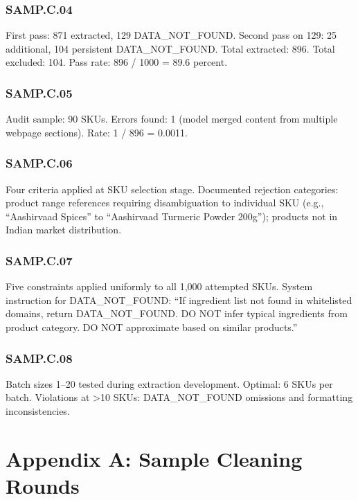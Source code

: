 \documentclass[
  letterpaper,
  DIV=11,
  numbers=noendperiod]{scrartcl}
\begin{document}
\subsubsection{SAMP.C.04}\label{samp.c.04}

First pass: 871 extracted, 129 DATA\_NOT\_FOUND. Second pass on 129: 25
additional, 104 persistent DATA\_NOT\_FOUND. Total extracted: 896. Total
excluded: 104. Pass rate: 896 / 1000 = 89.6 percent.

\subsubsection{SAMP.C.05}\label{samp.c.05}

Audit sample: 90 SKUs. Errors found: 1 (model merged content from
multiple webpage sections). Rate: 1 / 896 = 0.0011.

\subsubsection{SAMP.C.06}\label{samp.c.06}

Four criteria applied at SKU selection stage. Documented rejection
categories: product range references requiring disambiguation to
individual SKU (e.g., ``Aashirvaad Spices'' to ``Aashirvaad Turmeric
Powder 200g''); products not in Indian market distribution.

\subsubsection{SAMP.C.07}\label{samp.c.07}

Five constraints applied uniformly to all 1,000 attempted SKUs. System
instruction for DATA\_NOT\_FOUND: ``If ingredient list not found in
whitelisted domains, return DATA\_NOT\_FOUND. DO NOT infer typical
ingredients from product category. DO NOT approximate based on similar
products.''

\subsubsection{SAMP.C.08}\label{samp.c.08}

Batch sizes 1--20 tested during extraction development. Optimal: 6 SKUs
per batch. Violations at \textgreater10 SKUs: DATA\_NOT\_FOUND omissions
and formatting inconsistencies.

\section*{Appendix A: Sample Cleaning
Rounds}\label{appendix-a-sample-cleaning-rounds}
\end{document}
